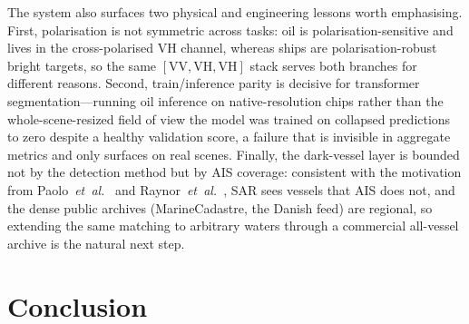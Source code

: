 \documentclass{ieeeaccess}
\begin{document}
The system also surfaces two physical and engineering lessons worth emphasising. First, polarisation is not symmetric across tasks: oil is polarisation-sensitive and lives in the cross-polarised VH channel, whereas ships are polarisation-robust bright targets, so the same $[\text{VV},\text{VH},\text{VH}]$ stack serves both branches for different reasons. Second, train/inference parity is decisive for transformer segmentation---running oil inference on native-resolution chips rather than the whole-scene-resized field of view the model was trained on collapsed predictions to zero despite a healthy validation score, a failure that is invisible in aggregate metrics and only surfaces on real scenes. Finally, the dark-vessel layer is bounded not by the detection method but by AIS coverage: consistent with the motivation from Paolo~\textit{et~al.}~\cite{3} and Raynor~\textit{et~al.}~\cite{2}, SAR sees vessels that AIS does not, and the dense public archives (MarineCadastre, the Danish feed) are regional, so extending the same matching to arbitrary waters through a commercial all-vessel archive is the natural next step.

\section{Conclusion}
\end{document}
